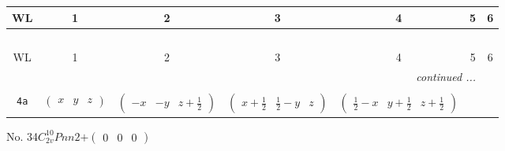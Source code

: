 \documentclass[fleqn,9pt,landscape]{jsarticle}
\begin{document}
\begin{center}
\renewcommand{\arraystretch}{1.2}
\begin{longtable}{ccccccc}
 \hline \hline
WL & 1 & 2 & 3 & 4 & 5 & 6 \\ \hline \endfirsthead

\multicolumn{6}{l}{\tablename\ \thetable{}} \\
 \hline \hline
WL & 1 & 2 & 3 & 4 & 5 & 6 \\ \hline \endhead

 \hline \hline
\multicolumn{6}{r}{\footnotesize\it continued ...} \\ \endfoot

 \hline \hline
\multicolumn{6}{r}{} \\ \endlastfoot

{\tt 4a} & $ \begin{pmatrix} x & y & z \end{pmatrix} $ & $ \begin{pmatrix} - x & - y & z + \frac{1}{2} \end{pmatrix} $ & $ \begin{pmatrix} x + \frac{1}{2} & \frac{1}{2} - y & z \end{pmatrix} $ & $ \begin{pmatrix} \frac{1}{2} - x & y + \frac{1}{2} & z + \frac{1}{2} \end{pmatrix} $ \\
\end{longtable}
\end{center}
\newpage
No. 34\quad$C_{2v}^{10}$\quad$Pnn2$\quad[ orthorhombic ]\quad$+\begin{pmatrix} 0 & 0 & 0 \end{pmatrix}$
\end{document}
